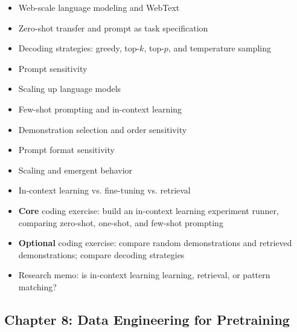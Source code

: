 \documentclass[11pt]{article}
\begin{document}
\begin{itemize}
    \item Web-scale language modeling and WebText
    \item Zero-shot transfer and prompt as task specification
    \item Decoding strategies: greedy, top-$k$, top-$p$, and temperature sampling
    \item Prompt sensitivity
    \item Scaling up language models
    \item Few-shot prompting and in-context learning
    \item Demonstration selection and order sensitivity
    \item Prompt format sensitivity
    \item Scaling and emergent behavior
    \item In-context learning vs. fine-tuning vs. retrieval
    \item \textbf{Core} coding exercise: build an in-context learning experiment runner, comparing zero-shot, one-shot, and few-shot prompting
    \item \textbf{Optional} coding exercise: compare random demonstrations and retrieved demonstrations; compare decoding strategies
    \item Research memo: is in-context learning learning, retrieval, or pattern matching?
\end{itemize}

\subsection{Chapter 8: Data Engineering for Pretraining}
\end{document}

